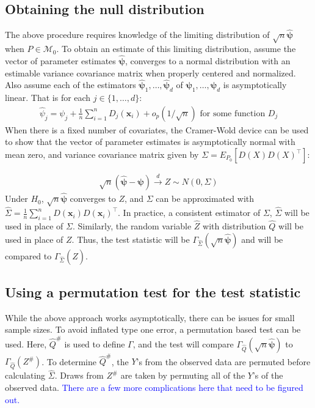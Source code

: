 \documentclass{article}
\newcommand{\vmat}{\Sigma}
\newcommand{\rvo}{X}
\newcommand{\disto}{P}
\newcommand{\rvv}{Z}
\newcommand{\distv}{Q}
\begin{document}
\subsection{Obtaining the null distribution}
\label{ssec:obtaining_null}
The above procedure requires knowledge of the limiting distribution of $\sqrt{n}\hat{\boldsymbol{\psi}}$ when $P \in \mathscr{M}_0$.  To obtain an estimate of this limiting distribution, assume the vector of parameter estimates $\hat{\boldsymbol{\psi}}$, converges to a normal distribution with an estimable variance covariance matrix when properly centered and normalized. Also assume each of the estimators $\hat{\boldsymbol{\psi}}_1, \dots, \hat{\boldsymbol{\psi}}_d$ of $\boldsymbol{\psi}_1, \dots, \boldsymbol{\psi}_d$ is asymptotically linear.  That is for each $j \in \{1, \dots, d\}$:
\begin{align*}
\hat{\psi}_j = \psi_j + \frac{1}{n}\sum_{i=1}^n D_j(\boldsymbol{x}_i) + o_p(1/\sqrt{n}) \text{ for some function } D_j
\end{align*}
When there is a fixed number of covariates, the Cramer-Wold device can be used to show that the vector of parameter estimates is asymptotically normal with mean zero, and variance covariance matrix given by $\Sigma = E_{\disto_0}\left[D(\rvo) D(\rvo)^\top \right]$:

\begin{align*}
    \sqrt{n}\left(\hat{\boldsymbol{\psi}} - \boldsymbol{\psi}\right) \xrightarrow{d} Z \sim N\left(0, \Sigma\right)
\end{align*}
Under $H_0$, $\sqrt{n}\hat{\boldsymbol{\psi}}$ converges to $Z$, and $\Sigma$ can be approximated with $\widehat{\Sigma} = \frac{1}{n}\sum_{i = 1}^n D(\boldsymbol{x}_i) D(\boldsymbol{x}_i)^\top$.  In practice, a consistent estimator of $\vmat$, $\hat{\vmat}$ will be used in place of $\vmat$. Similarly, the random variable $\hat{\rvv}$ with distribution $\hat{\distv}$ will be used in place of $\rvv$.  Thus, the test statistic will be $\Gamma_{\hat{\vmat}}(\sqrt{n} \hat{\boldsymbol{\psi}})$ and will be compared to $\Gamma_{\hat{\vmat}}(\hat{\rvv})$.

\subsection{Using a permutation test for the test statistic}
While the above approach works asymptotically, there can be issues for small sample sizes.  To avoid inflated type one error, a permutation based test can be used.  Here, $\hat{\distv}^\#$ is used to define $\Gamma$, and the test will compare $\Gamma_{\hat{\distv}}(\sqrt{n} \hat{\boldsymbol{\psi}})$ to $\Gamma_{\hat{\distv}}(\rvv^\#)$. To determine $\hat{\distv}^\#$, the $Y$'s from the observed data are permuted before calculating $\widehat \Sigma$.  Draws from $\rvv^\#$ are taken by permuting all of the $Y$'s of the observed data.  \textcolor{blue}{There are a few more complications here that need to be figured out.}
\end{document}

